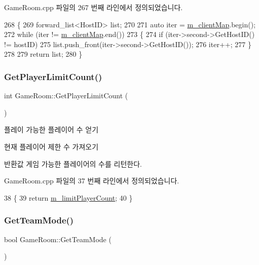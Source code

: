 Game\+Room.\+cpp 파일의 267 번째 라인에서 정의되었습니다.


\begin{DoxyCode}
268 \{
269     forward\_list<HostID> list;
270 
271     \textcolor{keyword}{auto} iter = \hyperlink{class_game_room_afc202a511605453216f7dd870ff96c5c}{m\_clientMap}.begin();
272     \textcolor{keywordflow}{while} (iter != \hyperlink{class_game_room_afc202a511605453216f7dd870ff96c5c}{m\_clientMap}.end())
273     \{
274         \textcolor{keywordflow}{if} (iter->second->GetHostID() != hostID)
275             list.push\_front(iter->second->GetHostID());
276         iter++;
277     \}
278 
279     \textcolor{keywordflow}{return} list;
280 \}
\end{DoxyCode}
\mbox{\label{class_game_room_a0bc57f748c9381c9741dbec7954643f9}} 
\subsubsection{\texorpdfstring{Get\+Player\+Limit\+Count()}{GetPlayerLimitCount()}}
{\footnotesize\ttfamily int Game\+Room\+::\+Get\+Player\+Limit\+Count (\begin{DoxyParamCaption}{ }\end{DoxyParamCaption})}



플레이 가능한 플레이어 수 얻기 

현재 플레이어 제한 수 가져오기

\begin{DoxyReturn}{반환값}
게임 가능한 플레이어의 수를 리턴한다. 
\end{DoxyReturn}


Game\+Room.\+cpp 파일의 37 번째 라인에서 정의되었습니다.


\begin{DoxyCode}
38 \{
39     \textcolor{keywordflow}{return} \hyperlink{class_game_room_ae03c39da189ee9097af8ee4cde8ba373}{m\_limitPlayerCount};
40 \}
\end{DoxyCode}
\mbox{\label{class_game_room_aa18f96d11b894fa1c6e0977dc5666b53}} 
\subsubsection{\texorpdfstring{Get\+Team\+Mode()}{GetTeamMode()}}
{\footnotesize\ttfamily bool Game\+Room\+::\+Get\+Team\+Mode (\begin{DoxyParamCaption}{ }\end{DoxyParamCaption})}




